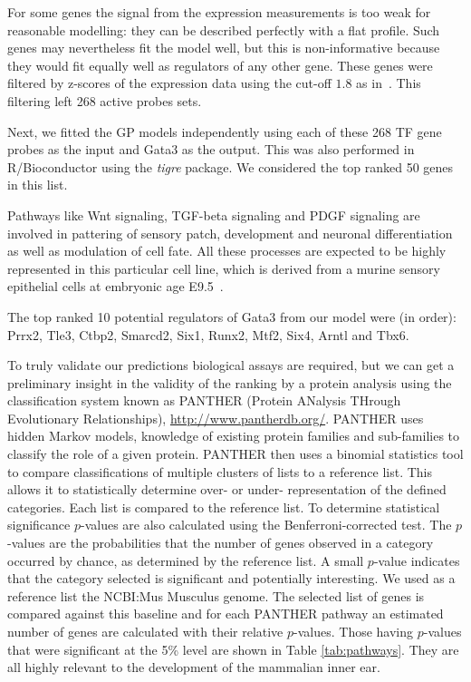 \documentclass{article}
\begin{document}
For some genes the signal from the expression measurements is too weak
for reasonable modelling: they can  be described perfectly with a flat
profile.  Such genes may nevertheless  fit the model well, but this is
non-informative because  they would fit equally well  as regulators of
any  other  gene.   These  genes  were filtered  by  z-scores  of  the
expression      data     using      the      cut-off     $1.8$      as
in~\cite{Honkela:modelbased10}.  This filtering left 268 active probes
sets.

Next, we fitted the GP models independently using each of these 268 TF
gene  probes as  the input  and Gata3  as the  output.  This  was also
performed in R/Bioconductor using the \emph{tigre} package. We considered the top ranked 50 genes in this list. 

Pathways like Wnt signaling, TGF-beta signaling and PDGF signaling are
involved  in  pattering of  sensory  patch,  development and  neuronal
differentiation  as  well  as  modulation  of  cell  fate.  All  these
processes  are expected to  be highly  represented in  this particular
cell line, which is derived  from a murine sensory epithelial cells at
embryonic age E9.5~\cite{Milo2009}.

The top ranked 10 potential regulators of Gata3 from our model were
(in order): Prrx2, Tle3, Ctbp2, Smarcd2, Six1, Runx2,
Mtf2, Six4, Arntl and Tbx6.

To truly validate our  predictions biological assays are required, but
we can get  a preliminary insight in the validity of  the ranking by a
protein  analysis using  the  classification system  known as  PANTHER
(Protein     ANalysis     THrough     Evolutionary     Relationships),
\url{http://www.pantherdb.org/}.   PANTHER uses hidden  Markov models,
knowledge of  existing protein families and  sub-families to classify the
role of a given protein.  PANTHER then uses a binomial statistics tool
to  compare  classifications  of  multiple  clusters  of  lists  to  a
reference  list. This allows  it to  statistically determine  over- or
under- representation of the defined categories. Each list is compared
to   the  reference  list.   To  determine   statistical  significance
$p$-values  are   also  calculated  using   the   Benferroni-corrected
test. The  $p$-values are the  probabilities that the number  of genes
observed  in a  category  occurred  by chance,  as  determined by  the
reference list. A small $p$-value indicates that the category selected
is significant  and potentially interesting.   We used as  a reference
list  the NCBI:Mus  Musculus genome.  The  selected list  of genes  is
compared  against  this  baseline  and  for each  PANTHER  pathway  an
estimated  number   of  genes  are  calculated   with  their  relative
$p$-values. Those  having $p$-values that were significant  at the 5\%
level  are shown  in  Table \ref{tab:pathways}.  They  are all  highly
relevant to the development of the mammalian inner ear.
\end{document}
